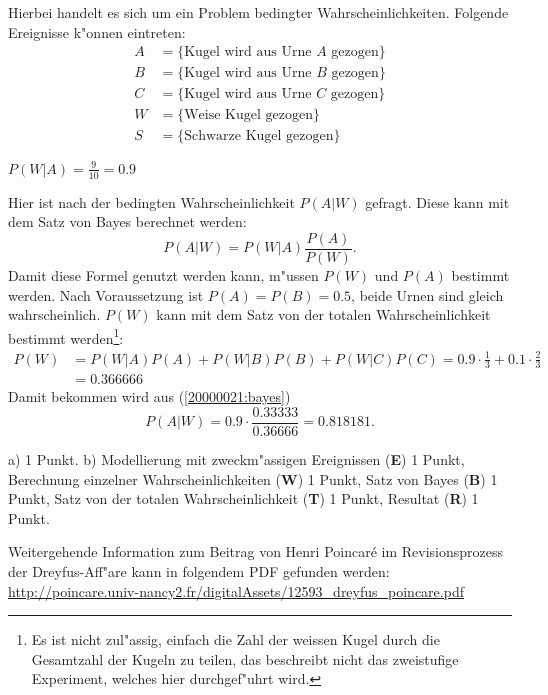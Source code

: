 \begin{loesung}
Hierbei handelt es sich um ein Problem bedingter Wahrscheinlichkeiten.
Folgende Ereignisse k"onnen eintreten:
\begin{align*}
A&=\{\text{Kugel wird aus Urne $A$ gezogen}\}\\
B&=\{\text{Kugel wird aus Urne $B$ gezogen}\}\\
C&=\{\text{Kugel wird aus Urne $C$ gezogen}\}\\
W&=\{\text{Weise Kugel gezogen}\}\\
S&=\{\text{Schwarze Kugel gezogen}\}
\end{align*}
\begin{teilaufgaben}
\item $P(W|A)=\frac{9}{10}= 0.9$
\item Hier ist nach der bedingten Wahrscheinlichkeit $P(A|W)$ gefragt.
Diese kann mit dem Satz von Bayes berechnet werden:
\begin{equation}
P(A|W)=P(W|A)\frac{P(A)}{P(W)}.
\label{20000021:bayes}
\end{equation}
Damit diese Formel genutzt werden kann, m"ussen $P(W)$ und $P(A)$
bestimmt werden.
Nach Voraussetzung ist $P(A)=P(B)=0.5$, beide Urnen sind gleich
wahrscheinlich. $P(W)$ kann mit dem Satz von der totalen
Wahrscheinlichkeit bestimmt werden\footnote{Es ist nicht zul"assig,
einfach die Zahl der weissen Kugel durch die Gesamtzahl der Kugeln
zu teilen, das beschreibt nicht das zweistufige Experiment, welches hier
durchgef"uhrt wird.}:
\begin{align*}
P(W)&=P(W|A)P(A)+P(W|B)P(B)+P(W|C)P(C)
     =0.9\cdot \frac13+0.1\cdot \frac23
\\
    &=0.366666
\end{align*}
Damit bekommen wird aus
(\ref{20000021:bayes})
\[
P(A|W)=0.9\cdot\frac{0.33333}{0.36666}=0.818181.
\]
\end{teilaufgaben}
\end{loesung}

\begin{bewertung}
a) 1 Punkt.
b) Modellierung mit zweckm"assigen Ereignissen ({\bf E}) 1 Punkt,
Berechnung einzelner Wahrscheinlichkeiten ({\bf W}) 1 Punkt,
Satz von Bayes ({\bf B}) 1 Punkt,
Satz von der totalen Wahrscheinlichkeit ({\bf T}) 1 Punkt,
Resultat ({\bf R}) 1 Punkt.
\end{bewertung}

\begin{diskussion}
Weitergehende Information zum Beitrag von Henri Poincar\'e im Revisionsprozess
der Dreyfus-Aff"are kann in folgendem PDF gefunden werden:
\url{http://poincare.univ-nancy2.fr/digitalAssets/12593_dreyfus_poincare.pdf}
\end{diskussion}


